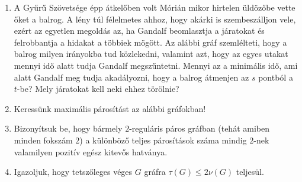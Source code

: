 \documentclass[a4paper, 12pt]{article}
\begin{document}
\begin{enumerate}
	\item A Gyűrű Szövetsége épp átkelőben volt Mórián mikor hirtelen üldözőbe vette őket a balrog. A lény túl félelmetes ahhoz, hogy akárki is szembeszálljon vele, ezért az egyetlen megoldás az, ha Gandalf beomlasztja a járatokat és felrobbantja a hidakat a többiek mögött. Az alábbi gráf szemlélteti, hogy a balrog milyen irányokba tud közlekedni, valamint azt, hogy az egyes utakat mennyi idő alatt tudja Gandalf megszűntetni. Mennyi az a minimális idő, ami alatt Gandalf meg tudja akadályozni, hogy a balrog átmenjen az $s$ pontból a $t$-be? Mely járatokat kell neki ehhez törölnie?
	\begin{figure}[h]
		\centering
		
	\end{figure}
	\item Keressünk maximális párosítást az alábbi gráfokban!
	\begin{figure}[h]
		\centering
		\begin{subfigure}[b]{0.45\textwidth}
			\centering
			
		\end{subfigure}
		\begin{subfigure}[b]{0.45\textwidth}
			\centering
			
		\end{subfigure}
	\end{figure}
	\begin{figure}[h]
	\centering
		\begin{subfigure}[b]{0.45\textwidth}
			\centering
			
		\end{subfigure}
		\begin{subfigure}[b]{0.45\textwidth}
			\centering
			
		\end{subfigure}
	\end{figure}
	\item Bizonyítsuk be, hogy bármely $2$-reguláris páros gráfban (tehát amiben minden fokszám $2$) a különböző teljes párosítások száma mindig $2$-nek valamilyen pozitív egész kitevős hatványa.

\item Igazoljuk, hogy tetszőleges véges $G$ gráfra $\tau(G)\le 2 \nu (G)$ teljesül.



\end{enumerate}
\end{document}
